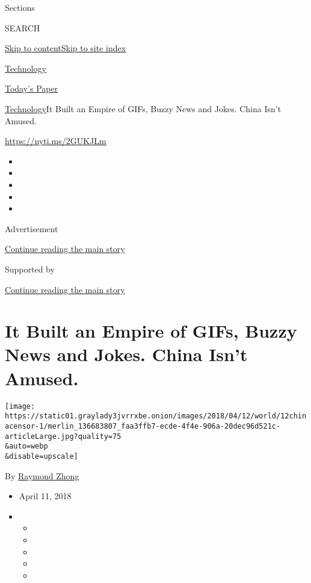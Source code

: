 Sections

SEARCH

\protect\hyperlink{site-content}{Skip to
content}\protect\hyperlink{site-index}{Skip to site index}

\href{https://www.nytimes3xbfgragh.onion/section/technology}{Technology}

\href{https://myaccount.nytimes3xbfgragh.onion/auth/login?response_type=cookie\&client_id=vi}{}

\href{https://www.nytimes3xbfgragh.onion/section/todayspaper}{Today's
Paper}

\href{/section/technology}{Technology}\textbar{}It Built an Empire of
GIFs, Buzzy News and Jokes. China Isn't Amused.

\url{https://nyti.ms/2GUKJLm}

\begin{itemize}
\item
\item
\item
\item
\item
\end{itemize}

Advertisement

\protect\hyperlink{after-top}{Continue reading the main story}

Supported by

\protect\hyperlink{after-sponsor}{Continue reading the main story}

\hypertarget{it-built-an-empire-of-gifs-buzzy-news-and-jokes-china-isnt-amused}{%
\section{It Built an Empire of GIFs, Buzzy News and Jokes. China Isn't
Amused.}\label{it-built-an-empire-of-gifs-buzzy-news-and-jokes-china-isnt-amused}}

\texttt{[image: https://static01.graylady3jvrrxbe.onion/images/2018/04/12/world/12chinacensor-1/merlin\_136683807\_faa3ffb7-ecde-4f4e-906a-20dec96d521c-articleLarge.jpg?quality=75\\\&auto=webp\\\&disable=upscale]}

By \href{https://www.nytimes3xbfgragh.onion/by/raymond-zhong}{Raymond
Zhong}

\begin{itemize}
\item
  April 11, 2018
\item
  \begin{itemize}
  \item
  \item
  \item
  \item
  \item
  \end{itemize}
\end{itemize}

